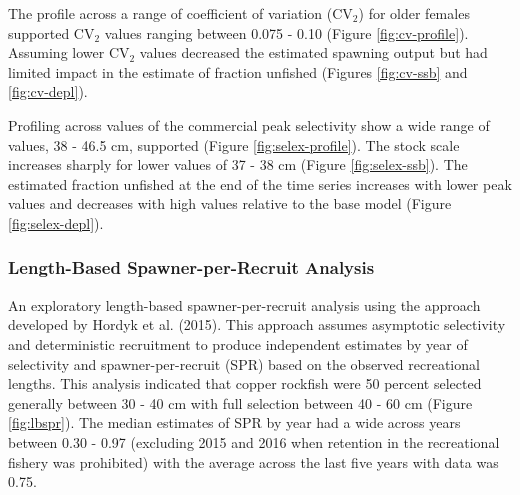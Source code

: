 \documentclass[11pt,
  english,
  a4paper,
]{article}
\begin{document}
\leavevmode\tagmcend\tagstructend\par


The profile across a range of coefficient of variation ({\(\text{CV}_2\)\leavevmode\tagmcend\tagstructend}) for older females supported {\(\text{CV}_2\)\leavevmode\tagmcend\tagstructend} values ranging between 0.075 - 0.10 (Figure \ref{fig:cv-profile}). Assuming lower {\(\text{CV}_2\)\leavevmode\tagmcend\tagstructend} values decreased the estimated spawning output but had limited impact in the estimate of fraction unfished (Figures \ref{fig:cv-ssb} and \ref{fig:cv-depl}).

\leavevmode\tagmcend\tagstructend\par


Profiling across values of the commercial peak selectivity show a wide range of values, 38 - 46.5 cm, supported (Figure \ref{fig:selex-profile}). The stock scale increases sharply for lower values of 37 - 38 cm (Figure \ref{fig:selex-ssb}). The estimated fraction unfished at the end of the time series increases with lower peak values and decreases with high values relative to the base model (Figure \ref{fig:selex-depl}).

\leavevmode\tagmcend\tagstructend\par


\hypertarget{length-based-spawner-per-recruit-analysis}{%
\subsubsection{Length-Based Spawner-per-Recruit Analysis}\label{length-based-spawner-per-recruit-analysis}}

\leavevmode\tagmcend\tagstructend


An exploratory length-based spawner-per-recruit analysis using the approach developed by Hordyk et al. {(2015)\leavevmode\tagmcend\tagstructend}. This approach assumes asymptotic selectivity and deterministic recruitment to produce independent estimates by year of selectivity and spawner-per-recruit (SPR) based on the observed recreational lengths. This analysis indicated that copper rockfish were 50 percent selected generally between 30 - 40 cm with full selection between 40 - 60 cm (Figure \ref{fig:lbspr}). The median estimates of SPR by year had a wide across years between 0.30 - 0.97 (excluding 2015 and 2016 when retention in the recreational fishery was prohibited) with the average across the last five years with data was 0.75.
\end{document}
